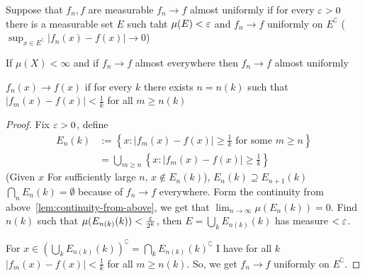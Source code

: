 \begin{definition}
  Suppose that $f_n, f$ are measurable
  $f_n \to f$ almost uniformly if for every $\varepsilon > 0$
  there is a measurable set $E$ such taht $\mu(E) < \varepsilon$ and $f_n \to f$ uniformly on $E^\complement$
  ($\sup_{x\in E^\complement} |f_n(x) - f(x)| \to 0$)
\end{definition}

\begin{theorem}
  If $\mu(X) < \infty$ and if $f_n \to f$ almost everywhere then 
  $f_n \to f$ almost uniformly
\end{theorem}

\begin{remark}
  $f_n(x) \to f(x)$ if for every $k$ there exists $n = n(k)$ such that
  $|f_m(x) - f(x)| < \frac1k$ for all $m \ge n(k)$
\end{remark}

\begin{proof}
  Fix $\varepsilon > 0$, define 
  \begin{align*}
    E_n(k) &:= \left\{x : |f_m(x) - f(x)| \ge \frac1k \text{ for some }m \ge n\right\} \\
    &= \bigcup_{m \ge n} \left\{x : |f_m(x) - f(x)| \ge \frac1k\right\}
  \end{align*}
  (Given $x$ For sufficiently large $n$, $x \notin E_n(k)$), $E_n(k) \supseteq E_{n+1}(k)$
  $\bigcap_n E_n(k) = \emptyset$ because of $f_n \to f$ everywhere.
  Form the continuity from above~\ref{lem:continuity-from-above}, we get that $\lim_{n\to\infty}\mu(E_n(k)) = 0$.
  Find $n(k)$ such that $\mu(E_{n(k)}(k)) < \frac{\varepsilon}{2^k}$, then $E = \bigcup_k E_{n(k)}(k)$ has measure $< \varepsilon$.
  
  For $x\in \left(\bigcup_k E_{n(k)}(k)\right)^\complement = \bigcap_k E_{n(k)}(k)^\complement$
  I have for all $k$ $|f_m(x) - f(x)| < \frac1k$ for all $m \ge n(k)$.
  So, we get $f_n \to f$ uniformly on $E^\complement$.
\end{proof}